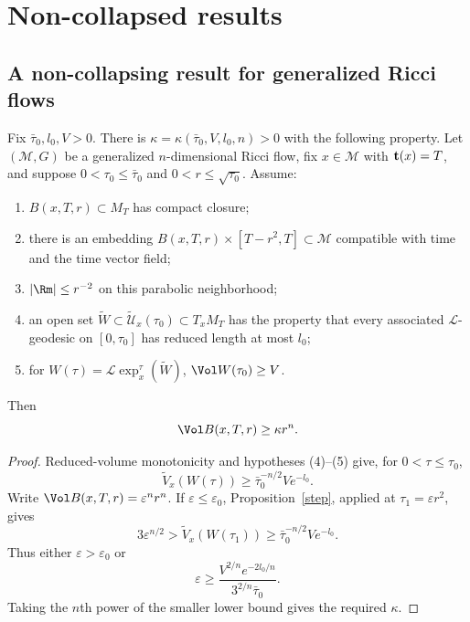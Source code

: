 \chapter{Non-collapsed results}
\label{chap:noncollapsed}
\label{noncoll}

\section{A non-collapsing result for generalized Ricci flows}

\begin{theorem}
\label{thm:kappa-noncollapsed-generalized-flow}
\label{THM}
Fix $\bar\tau_0,l_0,V>0$. There is
$\kappa=\kappa(\bar\tau_0,V,l_0,n)>0$ with the following property.
Let $({\mathcal M},G)$ be a generalized $n$-dimensional Ricci flow, fix
$x\in{\mathcal M}$ with ${\bf t}(x)=T$, and suppose
$0<\tau_0\leq\bar\tau_0$ and $0<r\leq\sqrt{\tau_0}$. Assume:
\begin{enumerate}
\item[(1)] $B(x,T,r)\subset M_T$ has compact closure;
\item[(2)] there is an embedding
$B(x,T,r)\times[T-r^2,T]\subset{\mathcal M}$ compatible with time and the
time vector field;
\item[(3)] $|\Rm|\leq r^{-2}$ on this parabolic neighborhood;
\item[(4)] an open set
$\widetilde W\subset\widetilde{\mathcal U}_x(\tau_0)\subset T_xM_T$ has the
property that every associated $\mathcal L$-geodesic on $[0,\tau_0]$ has
reduced length at most $l_0$;
\item[(5)] for
$W(\tau)={\mathcal L}\operatorname{exp}_x^\tau(\widetilde W)$,
$\Vol W(\tau_0)\geq V$.
\end{enumerate}
Then
\[
  \Vol B(x,T,r)\geq\kappa r^n.
\]
\end{theorem}

\begin{proof}
\sketch
{}
Reduced-volume monotonicity and hypotheses (4)--(5) give, for
$0<\tau\leq\tau_0$,
\begin{equation}
\label{redvoleqn}
  \widetilde V_x(W(\tau))
  \geq\bar\tau_0^{-n/2}Ve^{-l_0}.
\end{equation}
Write
$\Vol B(x,T,r)=\varepsilon^nr^n$. If
$\varepsilon\leq\varepsilon_0$, Proposition~\ref{step}, applied at
$\tau_1=\varepsilon r^2$, gives
\[
  3\varepsilon^{n/2}>
  \widetilde V_x(W(\tau_1))
  \geq\bar\tau_0^{-n/2}Ve^{-l_0}.
\]
Thus either $\varepsilon>\varepsilon_0$ or
\[
  \varepsilon\geq
  \frac{V^{2/n}e^{-2l_0/n}}{3^{2/n}\bar\tau_0}.
\]
Taking the $n$th power of the smaller lower bound gives the required
$\kappa$.
\end{proof}

